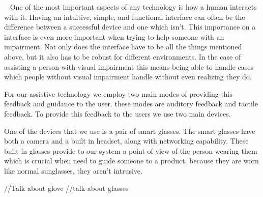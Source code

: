 ~\cite{iPhone}
One of the most important aspects of any technology is how a human interacts with it. Having an intuitive, simple, and functional interface can often be the difference between a successful device and one which isn't. This importance on a interface is even more important when trying to help someone with an impairment. Not only does the interface have to be all the things mentioned above, but it also has to be robust for different environments. In the case of assisting a person with visual impairment this means being able to handle cases which people without visual impairment handle without even realizing they do.

For our assistive technology we employ two main modes of providing this feedback and guidance to the user. these modes are auditory feedback and tactile feedback. To provide this feedback to the users we use two main devices.

One of the devices that we use is a pair of smart glasses. The smart glasses have both a camera and a built in headset, along with networking capability. These built in glasses provide to our system a point of view of the person wearing them which is crucial when need to guide someone to a product. because they are worn like normal sunglasses, they aren't intrusive. 

//Talk about glove
//talk about glasses
